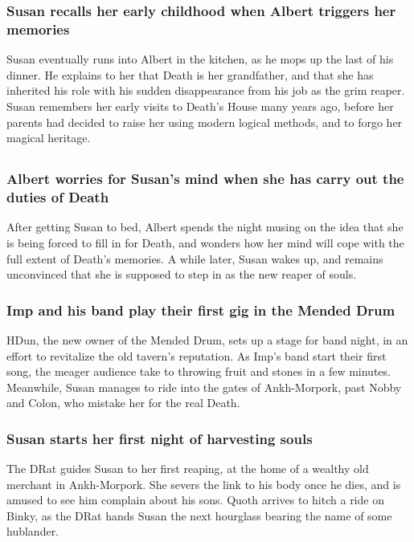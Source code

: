 \subsubsection{\Gls{Susan} recalls her early childhood when \Gls{Albert} triggers her memories}
\Gls{Susan} eventually runs into \Gls{Albert} in the kitchen, as he mops up the last of his dinner.
He explains to her that \Gls{Death} is her grandfather, and that she has inherited his role with
his sudden disappearance from his job as the grim reaper. \Gls{Susan} remembers her early visits to
\Gls{Death}'s House many years ago, before her parents had decided to raise her using modern logical
methods, and to forgo her magical heritage.

\subsection{}
\subsubsection{\Gls{Albert} worries for \Gls{Susan}'s mind when she has carry out the duties of
    \Gls{Death}}
After getting \Gls{Susan} to bed, \Gls{Albert} spends the night musing on the idea that she is
being forced to fill in for \Gls{Death}, and wonders how her mind will cope with the full extent
of \Gls{Death}'s memories. A while later, \Gls{Susan} wakes up, and remains unconvinced that she is
supposed to step in as the new reaper of souls.

\subsubsection{\Gls{Imp} and his band play their first gig in the Mended Drum}
\Gls{HDun}, the new owner of the Mended Drum, sets up a stage for band night, in an effort to
revitalize the old tavern's reputation. As \Gls{Imp}'s band start their first song, the meager
audience take to throwing fruit and stones in a few minutes. Meanwhile, \Gls{Susan} manages to
ride into the gates of Ankh-Morpork, past \Gls{Nobby} and \Gls{Colon}, who mistake her for the
real \Gls{Death}.

\subsubsection{\Gls{Susan} starts her first night of harvesting souls}
The \Gls{DRat} guides \Gls{Susan} to her first reaping, at the home of a wealthy old merchant in
Ankh-Morpork. She severs the link to his body once he dies, and is amused to see him complain about
his sons. \Gls{Quoth} arrives to hitch a ride on \Gls{Binky}, as the \Gls{DRat} hands \Gls{Susan}
the next hourglass bearing the name of some hublander.

